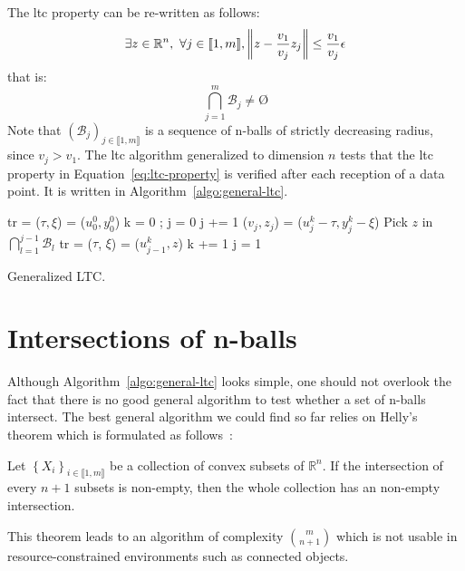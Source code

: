 The \acrshort{ltc} property can be re-written as follows:
\begin{equation}
\label{eq:ltc-property-detail}
\exists z \in \mathbb{R}^n, \ \forall j \in \llbracket 1, m \rrbracket, \left\lVert z-\frac{v_1}{v_j}z_j\right\rVert \leq
\frac{v_1}{v_j}\epsilon
\end{equation}
that is:
\begin{equation}
\bigcap_{j=1}^m \mathcal{B}_j \neq \text{\O}
\label{eq:ltc-property}
\end{equation}
Note that $(\mathcal{B}_j)_{j \in \llbracket 1, m \rrbracket}$ is a sequence
of n-balls of strictly decreasing radius, since $v_j > v_1$.
The \acrshort{ltc} algorithm generalized to dimension $n$ tests that the
\acrshort{ltc} property in Equation~\ref{eq:ltc-property} is verified after each
reception of a data point. It is written in Algorithm~\ref{algo:general-ltc}.
\begin{algorithm}
\begin{algorithmic}[1]
\Input
\EndInput
\Output
\EndOutput

\State tr = ($\tau, \xi$) = ($u^0_0, y^0_0$) 
\State k = 0 ; j = 0
    \State j += 1
    \State ($v_j, z_j$) = ($u_j^k - \tau, y_j^k - \xi$)
        \State Pick $z$ in $\bigcap_{l=1}^{j-1}{\mathcal{B}_l}$ 
        \State tr = ($\tau$, $\xi$) = ($u^k_{j-1}, z$)
        \State k += 1
        \State j = 1
    \EndIf
\EndWhile
\end{algorithmic}
\caption{Generalized LTC.}
\label{algo:general-ltc}
\end{algorithm}

\section{Intersections of n-balls}

Although Algorithm~\ref{algo:general-ltc} looks simple, one should not overlook
the fact that there is no good general algorithm to test whether a set of
n-balls intersect. The best general algorithm we could find so far relies on
Helly's theorem which is formulated as follows~\cite{helly1923mengen}:
\begin{theorem}
Let $\left\{ X_i \right\}_{i \in \llbracket 1, m \rrbracket}$ be a collection of
convex subsets of $\mathbb{R}^n$. If the intersection of every $n+1$ subsets is
non-empty, then the whole collection has an non-empty intersection.
\end{theorem}
\noindent This theorem leads to an algorithm of complexity ${\binom{m}{n+1}}$
which is not usable in resource-constrained environments such as connected
objects.

